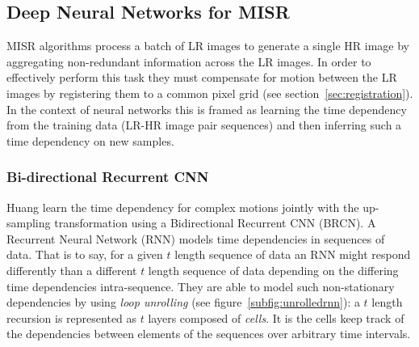 \subsection{Deep Neural Networks for MISR}
MISR algorithms process a batch of LR images to generate a single HR image by aggregating non-redundant information across the LR images.
%
In order to effectively perform this task they must compensate for motion between the LR images by registering them to a common pixel grid (see section~\ref{sec:registration}).
%
In the context of neural networks this is framed as learning the time dependency from the training data (LR-HR image pair sequences) and then inferring such a time dependency on new samples.
%
\subsubsection{Bi-directional Recurrent CNN}

Huang \etal \cite{huang2015bidirectional} learn the time dependency for complex motions jointly with the up-sampling transformation using a Bidirectional Recurrent CNN (BRCN). 
%
A Recurrent Neural Network (RNN) models time dependencies in sequences of data.
%
That is to say, for a given \(t\) length sequence of data an RNN might respond differently than a different \(t\) length sequence of data depending on the differing time dependencies intra-sequence.
%
They are able to model such non-stationary dependencies by using \textit{loop unrolling} (see figure~\ref{subfig:unrolledrnn}): a \(t\) length recursion is represented as \(t\) layers composed of \textit{cells}.
%
It is the cells keep track of the dependencies between elements of the sequences over arbitrary time intervals.
%
%

